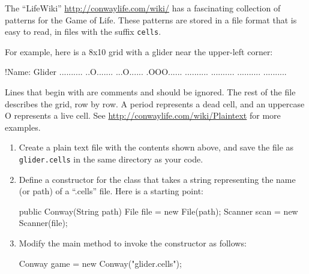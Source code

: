 \begin{exercise}


The ``LifeWiki'' \url{http://conwaylife.com/wiki/} has a fascinating collection of patterns for the Game of Life.
These patterns are stored in a file format that is easy to read, in files with the suffix {\tt cells}.

For example, here is a 8x10 grid with a glider near the upper-left corner:

\begin{stdout}
!Name: Glider
..........
..O.......
...O......
.OOO......
..........
..........
..........
..........
\end{stdout}

Lines that begin with \java{!} are comments and should be ignored.
The rest of the file describes the grid, row by row.
A period represents a dead cell, and an uppercase O represents a live cell.
See \url{http://conwaylife.com/wiki/Plaintext} for more examples.

\begin{enumerate}

\item Create a plain text file with the contents shown above, and save the file as \verb|glider.cells| in the same directory as your code.


\item Define a constructor for the  class that takes a string representing the name (or path) of a ``.cells'' file.
Here is a starting point:

\begin{code}
public Conway(String path) {
    File file = new File(path);
    Scanner scan = new Scanner(file);
}
\end{code}

\item Modify the main method to invoke the constructor as follows:

\begin{code}
Conway game = new Conway("glider.cells");
\end{code}


\end{enumerate}
\end{exercise}
